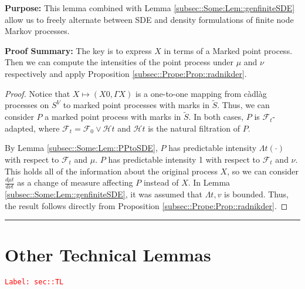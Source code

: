 \documentclass[12pt]{article}
\newcommand{\mc}{\mathcal}
\newcommand{\tr}{\textcolor{red}}
\newcommand{\labe}[1]{\tr{\texttt{Label: #1}}}
\newcommand{\purpose}{\textbf{Purpose: }}
\newcommand{\pfsum}{\textbf{Proof Summary: }}
\newcommand{\ind}{\hspace{24pt}}
\newcommand{\lin}{\rule{\linewidth}{0.4 pt}}
\renewcommand{\v}{v}							%
\renewcommand{\S}{S}							%
\renewcommand{\t}{t}							%
\newcommand{\F}{\mc{F}}							%
\newcommand{\FH}{\mc{H}}						%
\newcommand{\X}{X}								%
\newcommand{\carp}[1]{^{#1}}					%
\newcommand{\vsi}[1]{^{#1}}						%
\newcommand{\ts}[1]{_{#1}}						%
\newcommand{\alt}[1]{\widetilde{#1}}			%
\newcommand{\m}{\mu}							%
\newcommand{\mm}{\nu}							%
\newcommand{\pmap}{\Gamma}						%
\newcommand{\rp}{P}								%
\newcommand{\ratee}{\Lambda}					%
\begin{document}
\purpose This lemma combined with Lemma \ref{subsec::Some:Lem::genfiniteSDE} allow us to freely alternate between SDE and density formulations of finite node Markov processes.

\pfsum The key is to express \(X\) in terms of a Marked point process. Then we can compute the intensities of the point process under \(\m\) and \(\mm\) respectively and apply Proposition \ref{subsec::Prope:Prop::radnikder}.

\begin{proof}
Notice that \(\X{}{} \mapsto (\X{}{0},\pmap{\X{}{}})\) is a one-to-one mapping from c\`adl\`ag processes on \(\S\carp{V}\) to marked point processes with marks in \(\alt{\S}\). Thus, we can consider \(\rp{}\) a marked point process with marks in \(\alt{\S}\). In both cases, \(\rp{}\) is \(\F\vsi{}\ts{\t}\)-adapted, where \(\F\vsi{}\ts{\t} = \F\vsi{}\ts{0}\vee \FH{}{\t}\) and \(\FH{}{\t}\) is the natural filtration of \(\rp{}\).

\ind By Lemma \ref{subsec::Some:Lem::PPtoSDE}, \(\rp{}\) has predictable intensity \(\ratee{\t}(\cdot)\) with respect to \(\F\vsi{}\ts{\t}\) and \(\m{}{}{}\). \(\rp{}\) has predictable intensity 1 with respect to \(\F\vsi{}\ts{\t}\) and \(\mm{}{}{}\). This holds all of the information about the original process \(\X{}{}\), so we can consider \(\frac{d\m{}{\t}{}}{d\mm{}{\t}{}}\) as a change of measure affecting \(\rp{}\) instead of \(\X{}{}\). In Lemma \ref{subsec::Some:Lem::genfiniteSDE}, it was assumed that \(\ratee{\t,\v}\) is bounded. Thus, the result follows directly from Proposition \ref{subsec::Prope:Prop::radnikder}. 
\end{proof}

\lin
\section{Other Technical Lemmas}
\label{sec::TL}\labe{sec::TL}
\end{document}
